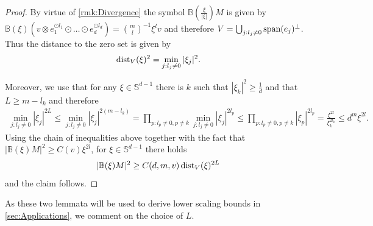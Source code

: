\documentclass[a4paper, 10pt, twoside, notitlepage]{amsart}
\theoremstyle{plain}
\begin{document}
		
		
			\begin{proof}
				By virtue of \cref{rmk:Divergence} the symbol $\mathbb{B}(\frac{\xi}{|\xi|})M$ is given by $\mathbb{B}(\xi)(v \otimes e_1^{\odot l_1} \odot \dots \odot e_d^{\odot l_d}) = \binom{m}{l}^{-1} \xi^l v$ and therefore
				$V = \bigcup_{j: l_j \neq 0} \operatorname{span}(e_j)^\perp$.  Thus the distance to the zero set is given by
				\begin{align*}
					\operatorname{dist}_V(\xi)^2 = \min_{j: l_j \neq 0} |\xi_j|^2.
				\end{align*}
				
				Moreover, we use that for any $\xi \in \mathbb{S}^{d-1}$ there is $k$ such that $|\xi_k|^2 \geq \frac{1}{d}$ and that $L \geq m - l_k$ and therefore
				\begin{align*}
					\min_{j: l_j \neq 0} |\xi_j|^{2L} \leq \min_{j:l_j \neq 0} |\xi_j|^{2(m-l_k)} = \prod_{p: l_p \neq 0, p \neq k} \min_{j:l_j \neq 0} |\xi_j|^{2l_p} \leq \prod_{p: l_p \neq 0, p \neq k} |\xi_p|^{2 l_p} = \frac{\xi^{2l}}{\xi_k^{2l_k}} \leq d^m \xi^{2l}.
				\end{align*}
				Using the chain of inequalities above together with the fact that $|\mathbb{B}(\xi)M|^2 \geq C(v) \xi^{2l}$, for $\xi \in \mathbb{S}^{d-1}$ there holds
				\begin{align*}
					|\mathbb{B}(\xi)M|^2 \geq C(d,m,v) \operatorname{dist}_V(\xi)^{2L}
				\end{align*}
				and the claim follows.
			\end{proof}
		
		
		 As these two lemmata will be used to derive lower scaling bounds in \cref{sec:Applications}, we comment on the choice of $L$.
		 
\end{document}
